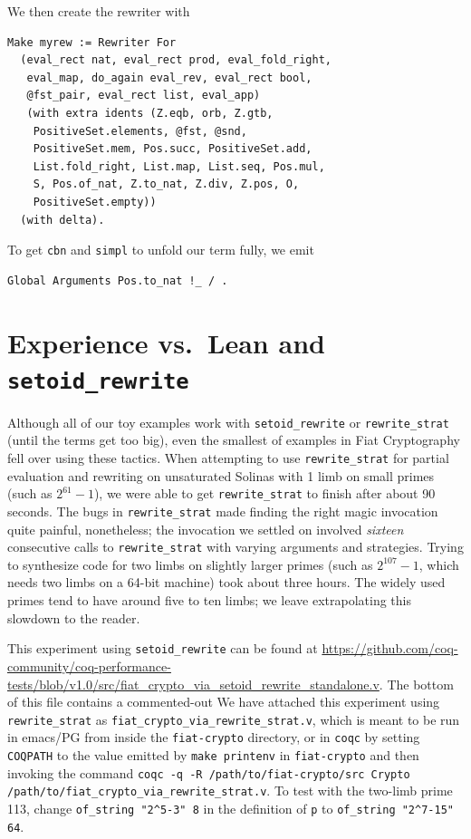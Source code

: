 \begin{subappendices}
We then create the rewriter with
\begin{verbatim}
Make myrew := Rewriter For
  (eval_rect nat, eval_rect prod, eval_fold_right,
   eval_map, do_again eval_rev, eval_rect bool,
   @fst_pair, eval_rect list, eval_app)
   (with extra idents (Z.eqb, orb, Z.gtb,
    PositiveSet.elements, @fst, @snd,
    PositiveSet.mem, Pos.succ, PositiveSet.add,
    List.fold_right, List.map, List.seq, Pos.mul,
    S, Pos.of_nat, Z.to_nat, Z.div, Z.pos, O,
    PositiveSet.empty))
  (with delta).
\end{verbatim}

To get \texttt{cbn} and \texttt{simpl} to unfold our term fully, we emit
\begin{verbatim}
Global Arguments Pos.to_nat !_ / .
\end{verbatim}


\section{Experience vs.\ Lean and \texorpdfstring{\texttt{setoid\_rewrite}}{setoid\_rewrite}\label{sec:lean}}

Although all of our toy examples work with \texttt{setoid\_rewrite} or \texttt{rewrite\_strat} (until the terms get too big), even the smallest of examples in Fiat Cryptography fell over using these tactics.
When attempting to use \texttt{rewrite\_strat} for partial evaluation and rewriting on unsaturated Solinas with 1 limb on small primes (such as $2^{61}-1$), we were able to get \texttt{rewrite\_strat} to finish after about 90 seconds.
The bugs in \texttt{rewrite\_strat} made finding the right magic invocation quite painful, nonetheless; the invocation we settled on involved \emph{sixteen} consecutive calls to \texttt{rewrite\_strat} with varying arguments and strategies.
Trying to synthesize code for two limbs on slightly larger primes (such as $2^{107}-1$, which needs two limbs on a 64-bit machine) took about three hours.
The widely used primes tend to have around five to ten limbs; we leave extrapolating this slowdown to the reader.

This experiment using \verb|setoid_rewrite| can be found at \url{https://github.com/coq-community/coq-performance-tests/blob/v1.0/src/fiat_crypto_via_setoid_rewrite_standalone.v}.
The bottom of this file contains a commented-out
We have attached this experiment using \verb|rewrite_strat| as \verb|fiat_crypto_via_rewrite_strat.v|, which is meant to be run in emacs/PG from inside the \verb|fiat-crypto| directory, or in \verb|coqc| by setting \verb|COQPATH| to the value emitted by \texttt{make printenv} in \verb|fiat-crypto| and then invoking the command \texttt{coqc -q -R /path/to/fiat-crypto/src Crypto /path/to/fiat\_crypto\_via\_rewrite\_strat.v}.
To test with the two-limb prime 113, change \verb|of_string "2^5-3" 8| in the definition of \verb|p| to \verb|of_string "2^7-15" 64|.


\end{subappendices}
